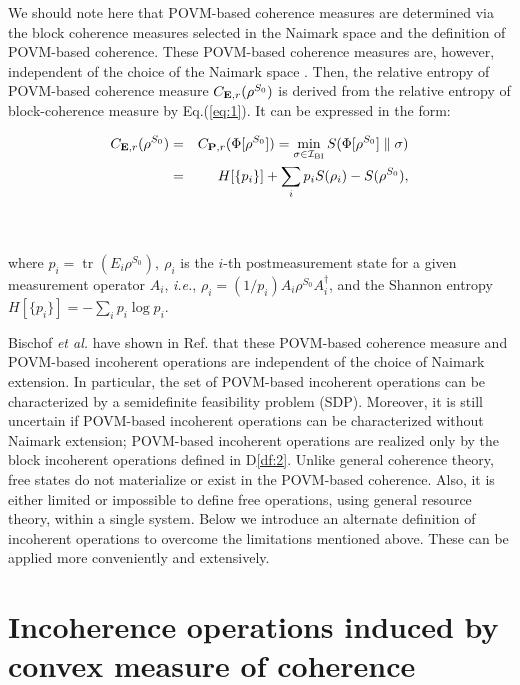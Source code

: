 \documentclass[american,aps,pra,reprint, superscriptaddress]{revtex4-1}
\theoremstyle{plain}
\DeclareMathOperator{\trace}{tr}
\newcommand{\ptr}[2]{\trace_{#1}({#2})}
\newcommand{\tr}[1]{\ptr{}{#1}}
\def\bP{\mathbf{P}}\def\bQ{\mathbf{Q}}\def\bR{\mathbf{R}}\def\bS{\mathbf{S}}\def\bT{\mathbf{T}}
\theoremstyle{definition}
\theoremstyle{remark}
\begin{document}
We should note here that POVM-based coherence measures are determined via the block coherence measures selected in the Naimark space and the definition of POVM-based coherence.
These POVM-based coherence measures are, however, independent of the choice of the Naimark space \cite{Bischof1}.
Then, the relative entropy of POVM-based coherence measure $C_{\mathbf{E},r}(\rho^{S_0})$ is derived from the relative entropy of block-coherence measure by Eq.(\ref{eq:1}). It can be expressed in the form:\\
\parbox{8.2cm}{
\begin{eqnarray*}
  C_{\bE,r}(\rho^{S_0})&=& C_{\bP,r}(\Phi[\rho^{S_0}]) = \min_{\sigma\in\cI_{\textmd{BI}}}S(\Phi[\rho^{S_0}]\parallel\sigma)\\
  &=& H[\{p_i\}] + \sum_ip_iS(\rho_i) - S(\rho^{S_0}),
\end{eqnarray*}}\hfill
\parbox{.3cm}{\begin{eqnarray}\label{eq:3}\end{eqnarray}}\\
where $p_i = \tr{E_i\rho^{S_0}},\ \rho_i$ is the $i$-th postmeasurement state for a given measurement operator $A_i$, \emph{i.e.}, $\rho_i = (1/p_i)A_i\rho^{S_0}A_i^{\dagger}$, and the Shannon entropy $H[\{p_i\}] = -\sum_ip_i\log p_i$.

Bischof \emph{et al.} have shown in Ref. \cite{Bischof1} that these POVM-based coherence measure and POVM-based incoherent operations are independent of the choice of Naimark extension. In particular, the set of POVM-based incoherent operations can be characterized by a semidefinite feasibility problem (SDP).
Moreover, it is still uncertain if POVM-based incoherent operations can be characterized without Naimark extension; POVM-based incoherent operations are realized only by the block incoherent operations defined in D\ref{df:2}.
Unlike general coherence theory, free states do not materialize or exist in the POVM-based coherence. Also, it is either limited or impossible to define free operations, using general resource theory, within a single system.
Below we introduce an alternate definition of incoherent operations to overcome the limitations mentioned above. These can be applied more conveniently and extensively.

\section{Incoherence operations induced by convex measure of coherence}
\end{document}
